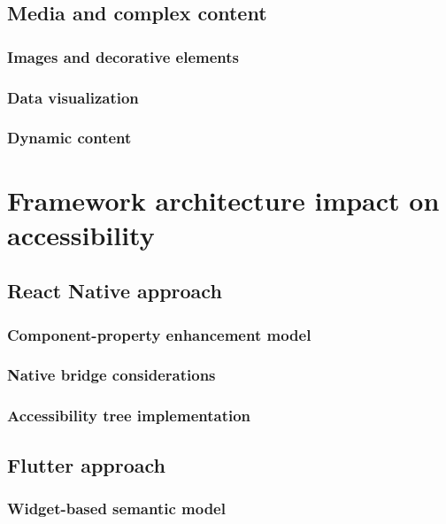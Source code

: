 \subsection{Media and complex content}

\subsubsection{Images and decorative elements}

\subsubsection{Data visualization}

\subsubsection{Dynamic content}

\section{Framework architecture impact on accessibility}

\subsection{React Native approach}

\subsubsection{Component-property enhancement model}

\subsubsection{Native bridge considerations}

\subsubsection{Accessibility tree implementation}

\subsection{Flutter approach}

\subsubsection{Widget-based semantic model}

